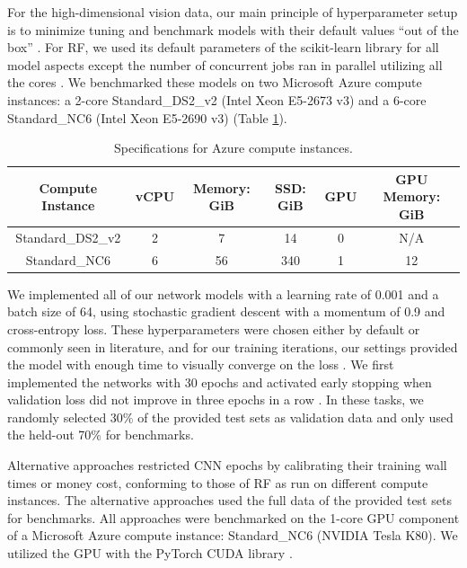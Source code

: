 For the high-dimensional vision data, our main principle of hyperparameter setup is to minimize tuning and benchmark models with their default values ``out of the box'' \citep{Probst2019hy}. For RF, we used its default parameters of the scikit-learn library for all model aspects except the number of concurrent jobs ran in parallel utilizing all the cores \citep{scikit-learn}. We benchmarked these models on two Microsoft Azure compute instances: a 2-core Standard\_DS2\_v2 (Intel Xeon E5-2673 v3) and a 6-core Standard\_NC6 (Intel Xeon E5-2690 v3) (Table \ref{table:azure}).

\begin{table}[htb]
\centering
\begin{tabular}{ |c|c|c|c|c|c| } 
\hline
Compute Instance & vCPU & Memory: GiB & SSD: GiB & GPU & GPU Memory: GiB \\
\hline
Standard\_DS2\_v2 & 2 & 7 & 14 & 0 & N/A \\
\hline
Standard\_NC6 & 6 & 56 & 340 & 1 & 12 \\
\hline
\end{tabular}
\caption{Specifications for Azure compute instances.}
\label{table:azure}
\end{table}

We implemented all of our network models with a learning rate of 0.001 and a batch size of 64, using stochastic gradient descent with a momentum of 0.9 and cross-entropy loss. These hyperparameters were chosen either by default or commonly seen in literature, and for our training iterations, our settings provided the model with enough time to visually converge on the loss \citep{Krizhevsky2012-sq, pmlr-v119-rice20a}.
We first implemented the networks with 30 epochs and activated early stopping when validation loss did not improve in three epochs in a row \citep{li2020, lutz, caruana}. In these tasks, we randomly selected 30\% of the provided test sets as validation data and only used the held-out 70\% for benchmarks.

Alternative approaches restricted CNN epochs by calibrating their training wall times or money cost, conforming to those of RF as run on different compute instances. The alternative approaches used the full data of the provided test sets for benchmarks. All approaches were benchmarked on the 1-core GPU component of a Microsoft Azure compute instance: Standard\_NC6 (NVIDIA Tesla K80).
We utilized the GPU with the PyTorch CUDA library \citep{pytorch}.

